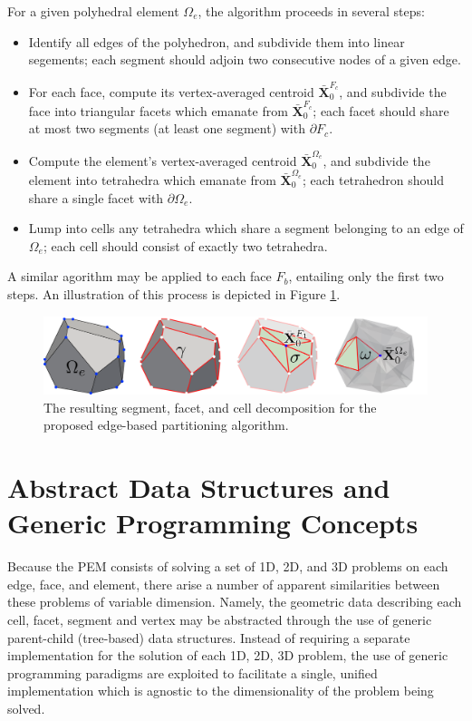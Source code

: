 	For a given polyhedral element $\Omega_e$, the algorithm proceeds in several steps:
	\begin{itemize}
		\item[1.)] Identify all edges of the polyhedron, and subdivide them into linear segements; each segment should adjoin two consecutive nodes of a given edge.
		\item[2.)] For each face, compute its vertex-averaged centroid $\bar{\mathbf{X}}^{F_c}_0$, and subdivide the face into triangular facets which emanate from $\bar{\mathbf{X}}^{F_c}_0$; each facet should share at most two segments (at least one segment) with $\partial F_c$.
		\item[3a.)] Compute the element's vertex-averaged centroid $\bar{\mathbf{X}}^{\Omega_e}_0$, and subdivide the element into tetrahedra which emanate from $\bar{\mathbf{X}}^{\Omega_e}_0$; each tetrahedron should share a single facet with $\partial \Omega_e$.
		\item[3b.)] Lump into cells any tetrahedra which share a segment belonging to an edge of $\Omega_e$; each cell should consist of exactly two tetrahedra.
	\end{itemize}
	A similar agorithm may be applied to each face $F_b$, entailing only the first two steps. An illustration of this process is depicted in Figure \ref{fig:partitioning_algorithm}.
	\begin{figure} [!ht]
		\centering
		\includegraphics[width = 6.0in]{figures/partitioning_algorithm.pdf}
		\caption{The resulting segment, facet, and cell decomposition for the proposed edge-based partitioning algorithm.}
		\label{fig:partitioning_algorithm}
	\end{figure}
	

\section{Abstract Data Structures and Generic Programming Concepts}

	Because the PEM consists of solving a set of 1D, 2D, and 3D problems on each edge, face, and element, there arise a number of apparent similarities between these problems of variable dimension. Namely, the geometric data describing each cell, facet, segment and vertex may be abstracted through the use of generic parent-child (tree-based) data structures. Instead of requiring a separate implementation for the solution of each 1D, 2D, 3D problem, the use of generic programming paradigms are exploited to facilitate a single, unified implementation which is agnostic to the dimensionality of the problem being solved.
	
